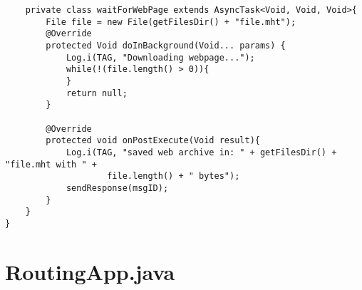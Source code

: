 \begin{verbatim}
    private class waitForWebPage extends AsyncTask<Void, Void, Void>{
        File file = new File(getFilesDir() + "file.mht");
        @Override
        protected Void doInBackground(Void... params) {
            Log.i(TAG, "Downloading webpage...");
            while(!(file.length() > 0)){
            }
            return null;
        }

        @Override
        protected void onPostExecute(Void result){
            Log.i(TAG, "saved web archive in: " + getFilesDir() + "file.mht with " +
                    file.length() + " bytes");
            sendResponse(msgID);
        }
    }
}

\end{verbatim}

\section{RoutingApp.java}
\label{appendix:RoutingApp}

